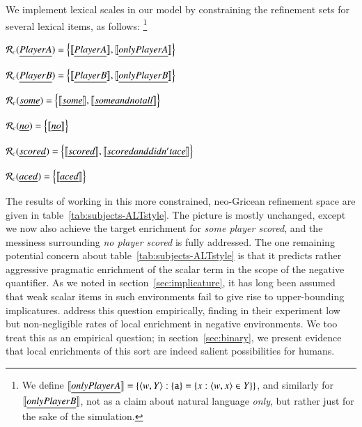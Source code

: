 \documentclass[leqno,12pt]{article}
\newcommand{\secref}[1]{section~\ref{#1}}
\newcommand{\tabref}[1]{table~\ref{#1}}
\newcommand{\word}[1]{\emph{#1}}
\newcommand{\set}[1]{\ensuremath{\left\{ #1 \right\}}}
\newcommand{\tuple}[1]{\langle #1 \rangle}
\newcommand{\sem}[1]{\ensuremath{\llbracket#1\rrbracket}}
\newcommand{\Refine}[1][c]{\mathcal{R}_{#1}}
\newcommand{\playera}{\texttt{a}}
\begin{document}
{We implement lexical scales in our model by constraining the
refinement sets for several lexical items, as follows:%
\footnote{We define
  $\sem{\word{only Player A}} = \set{\tuple{w, Y} : \set{\playera} =
    \set{x : \tuple{w,x} \in Y}}$,
  and similarly for $\sem{\word{only Player B}}$, not as a claim about
  natural language \word{only}, but rather just for the sake of the
  simulation.}
%
\begin{examples}
\item\label{neo}
  \begin{examples}
  \item $\Refine(\word{Player A}) = \set{\sem{\word{Player A}}, \sem{\word{only Player A}}}$
  \item $\Refine(\word{Player B}) = \set{\sem{\word{Player B}}, \sem{\word{only Player B}}}$
  \item $\Refine(\word{some}) = \set{\sem{\word{some}}, \sem{\word{some and not all}}}$
  \item $\Refine(\word{no}) = \set{\sem{\word{no}}}$    
  \item $\Refine(\word{scored}) = \set{\sem{\word{scored}}, \sem{\word{scored and didn't ace}}}$
  \item $\Refine(\word{aced}) = \set{\sem{\word{aced}}}$
  \end{examples}
\end{examples}
%
The results of working in this more constrained, neo-Gricean
refinement space are given in \tabref{tab:subjects-ALTstyle}. The
picture is mostly unchanged, except we now also achieve the target
enrichment for \word{some player scored}, and the messiness
surrounding \word{no player scored} is fully addressed. The one
remaining potential concern about \tabref{tab:subjects-ALTstyle} is
that it predicts rather aggressive pragmatic enrichment of the scalar
term in the scope of the negative quantifier. As we noted in
\secref{sec:implicature}, it has long been assumed that weak scalar
items in such environments fail to give rise to upper-bounding
implicatures. \citet{Chemla:Spector:2011} address this question
empirically, finding in their experiment low but non-negligible rates
of local enrichment in negative environments. We too treat this as an
empirical question; in \secref{sec:binary}, we present evidence that
local enrichments of this sort are indeed salient possibilities for
humans.

}
\end{document}
